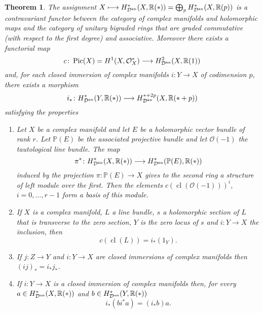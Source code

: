 \documentclass[10pt,twoside]{article}
\numberwithin{equation}{section}
\theoremstyle{plain}
\newtheorem{theorem}[equation]{Theorem}
\theoremstyle{definition}
\DeclareMathOperator{\cl}{cl}
\DeclareMathOperator{\Pic}{Pic}
\newcommand{\an}{\text{{\rm an}}}
\begin{document}
\begin{theorem} \label{thm:13}
  The assignment $X\longmapsto
  H^{\ast}_{\mathcal{D}^{\an}}(X,\mathbb{R}(\ast))= 
  \bigoplus_{p}H^{\ast}_{\mathcal{D}^{\an}}(X,\mathbb{R}(p))$ is a
  contravariant functor between the category of complex manifolds and
  holomorphic maps and the category of unitary bigraded rings that are graded
  commutative (with respect to the first degree) and
  associative. Moreover
  there exists a functorial map
    \begin{displaymath}
      c\colon\Pic(X)=H^{1}(X,\mathcal{O}^{\ast}_{X})\longrightarrow 
      H^{2}_{\mathcal{D}^{\an}}(X,\mathbb{R}(1))
    \end{displaymath}
    and, for each closed immersion of complex manifolds
    $i\colon Y\longrightarrow X$ of codimension $p$, there exists a morphism
    \begin{displaymath}
      i_{\ast}\colon H^{*}_{\mathcal{D}^{\an}}(Y,\mathbb{R}(*))\longrightarrow 
      H^{*+2p}_{\mathcal{D}^{\an}}(X,\mathbb{R}(*+p))
    \end{displaymath}
    satisfying the properties
    \begin{enumerate}
    \item [A1] \label{item:20} Let $X$ be a complex manifold and let
      $E$ be a holomorphic 
      vector bundle of rank $r$. Let $\mathbb{P}(E)$ be the associated
      projective 
      bundle and let $\mathcal{O}(-1)$ the tautological line
      bundle. The map
      \begin{displaymath}
        \pi ^{\ast}\colon H^{\ast}_{\mathcal{D}^{\an}}(X,\mathbb{R}(\ast))
        \longrightarrow
        H^{\ast}_{\mathcal{D}^{\an}}(\mathbb{P}(E),\mathbb{R}(\ast)) 
      \end{displaymath}
      induced by the projection $\pi \colon\mathbb{P}(E)\longrightarrow X$
      gives to the second ring a structure of left
      module  over the first. Then
      the elements $c(\cl(\mathcal{O}(-1)))^{i}$, $i=0,\dots ,r-1$
      form a basis of this module.  
  \item [A2] \label{item:21} If $X$ is a complex manifold, $L$  a line
    bundle, $s$ a 
    holomorphic section of $L$ that is transverse to the zero section,
    $Y$ is the zero locus of $s$ and $i\colon Y\longrightarrow X$ the
    inclusion, then 
    \begin{displaymath}
      c(\cl(L))=i _{\ast}(1_{Y}).
    \end{displaymath}
  \item [A3] \label{item:22} If $j\colon Z\longrightarrow Y$ and
    $i\colon Y\longrightarrow X$ are 
    closed immersions of complex manifolds then
    $(ij)_{\ast}=i_{\ast}j_{\ast}$.
  \item [A4] \label{item:23} If $i\colon Y\longrightarrow X$ is a closed
    immersion of 
    complex manifolds then, for every $a\in
    H^{\ast}_{\mathcal{D}^{\an}}(X,\mathbb{R}(\ast))$ and $b\in
    H^{\ast}_{\mathcal{D}^{\an}}(Y,\mathbb{R}(\ast))$ 
    \begin{displaymath}
      i_{\ast}(b i^{\ast}a)=(i_{\ast} b)a.
    \end{displaymath}
  \end{enumerate}
\end{theorem}
\end{document}
